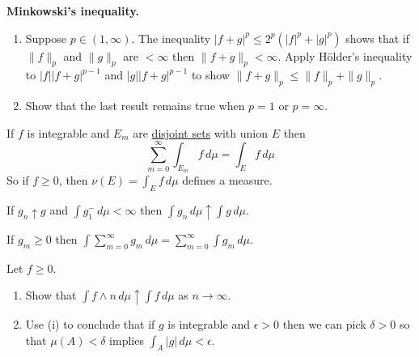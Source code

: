   \begin{exercise}[Durrett 1.5.3]
    \textbf{Minkowski's inequality.}
    \begin{enumerate}
      \item Suppose $p \in (1, \infty)$. The inequality $|f + g|^p \leq 2^p(|f|^p + |g|^p)$ shows that if $\|f\|_p$ and $\|g\|_p$ are $< \infty$ then $\|f + g\|_p < \infty$. Apply H\"{o}lder's inequality to $|f| |f + g|^{p-1}$ and $|g| |f + g|^{p-1}$ to show $\|f + g\|_p \leq \|f\|_p + \|g\|_p$.
      \item Show that the last result remains true when $p = 1$ or $p = \infty$.
    \end{enumerate}
  \end{exercise}
  \begin{solution}

  \end{solution}

  \begin{exercise}[Durrett 1.5.4]
    If $f$ is integrable and $E_m$ are \hyperref[st-def:disjoint-sets]{disjoint sets} with union $E$ then
    \begin{equation*}
      \sum_{m=0}^{\infty} \int_{E_m} f \, d\mu = \int_E f \, d\mu
    \end{equation*}
    So if $f \geq 0$, then $\nu(E) = \int_E f \, d\mu$ defines a measure.
  \end{exercise}
  \begin{solution}

  \end{solution}

  \begin{exercise}[Durrett 1.5.5]
    If $g_n \uparrow g$ and $\int g_1^- \, d\mu < \infty$ then $\int g_n \, d\mu \uparrow \int g \, d\mu$.
  \end{exercise}
  \begin{solution}

  \end{solution}

  \begin{exercise}[Durrett 1.5.6]
    If $g_m \geq 0$ then $\int \sum_{m=0}^{\infty} g_m \, d\mu = \sum_{m=0}^{\infty} \int g_m \, d\mu$.
  \end{exercise}
  \begin{solution}

  \end{solution}

  \begin{exercise}[Durrett 1.5.7]
    Let $f \geq 0$.
    \begin{enumerate}
      \item Show that $\int f \wedge n \, d\mu \uparrow \int f \, d\mu$ as $n \to \infty$.
      \item Use (i) to conclude that if $g$ is integrable and $\epsilon > 0$ then we can pick $\delta > 0$ so that $\mu(A) < \delta$ implies $\int_A |g| \, d\mu < \epsilon$.
    \end{enumerate}
  \end{exercise}
  \begin{solution}

  \end{solution}

